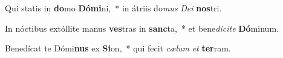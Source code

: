 \item Qui statis in \textbf{do}mo \textbf{Dó}\textbf{mi}ni,~* in átriis do\textit{mus} \textit{De}\textit{i} \textbf{nos}tri.
\item In nóctibus extóllite manus \textbf{ves}tras in \textbf{sanc}ta,~* et bene\textit{dí}\textit{ci}\textit{te} \textbf{Dó}minum.
\item Benedícat te Dómi\textbf{nus} ex \textbf{Si}on,~* qui fecit \textit{cæ}\textit{lum} \textit{et} \textbf{ter}ram.
